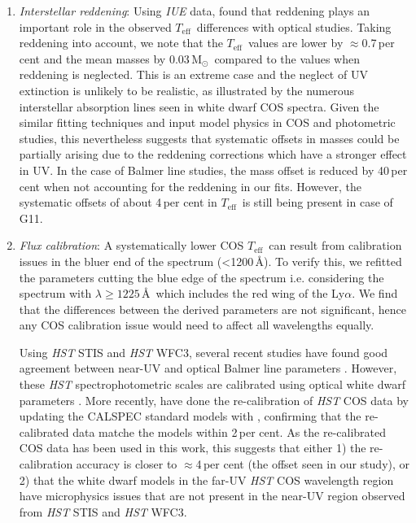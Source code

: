 \documentclass[fleqn,usenatbib, useAMS]{mnras}
\newcommand{\Teff}{\mbox{$T_{\mathrm{eff}}$}}
\newcommand{\Msun}{\mbox{$\mathrm{M_\odot}$}}
\begin{document}
\begin{enumerate}
\item \textit{Interstellar reddening}: Using \textit{IUE} data, \cite{Lajoie2007} found that reddening plays an important role in the observed \Teff\ differences with optical studies. Taking reddening into account, we note that the \Teff\ values are lower by $\approx$0.7\,per cent and the mean masses by 0.03\,\Msun\ compared to the values when reddening is neglected. This is an extreme case and the neglect of UV extinction is unlikely to be realistic, as illustrated by the numerous interstellar absorption lines seen in white dwarf COS spectra. Given the similar fitting techniques and input model physics in COS and photometric studies, this nevertheless suggests that systematic offsets in masses could be partially arising due to the reddening corrections which have a stronger effect in UV. In the case of Balmer line studies, the mass offset is reduced by 40\,per cent when not accounting for the reddening in our fits. However, the systematic offsets of about 4\,per cent in \Teff\ is still being present in case of G11.\\

\item \textit{Flux calibration}: A systematically lower COS \Teff\ can result from calibration issues in the bluer end of the spectrum (<1200\,\AA). To verify this, we refitted the parameters cutting the blue edge of the spectrum i.e. considering the spectrum with $\lambda\geq1225$\,\AA\ which includes the red wing of the Ly$\alpha$. We find that the differences between the derived parameters are not significant, hence any COS calibration issue would need to affect all wavelengths equally.
    
Using \textit{HST} STIS and \textit{HST} WFC3, several recent studies have found good agreement between near-UV and optical Balmer line parameters \citep{Bohlin2014,Bohlin2019,Narayan2019,nicola2020,Axelrod2023}. However, these \textit{HST} spectrophotometric scales are calibrated using optical white dwarf parameters \citep{Bohlin2014}. More recently, \cite{2023cos..rept....5M} have done the re-calibration of \textit{HST} COS data by updating the CALSPEC standard models with \cite{Bohlin2020}, confirming that the re-calibrated data matche the models within 2\,per cent. As the re-calibrated COS data has been used in this work, this suggests that either 1) the re-calibration accuracy is closer to $\approx$4\,per cent (the offset seen in our study), or 2) that the white dwarf models in the far-UV \textit{HST} COS wavelength region have microphysics issues that are not present in the near-UV region observed from \textit{HST} STIS and \textit{HST} WFC3.
\end{enumerate}
\end{document}

